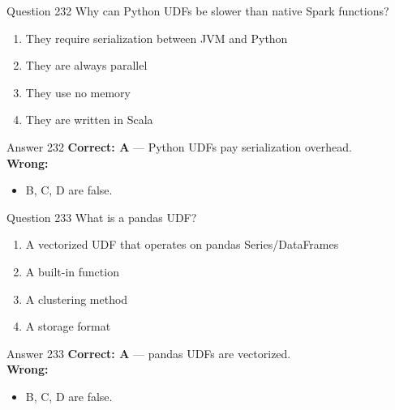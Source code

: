 \documentclass[aspectratio=169,11pt]{beamer}
\begin{document}
	\begin{frame}{Question 232}
		Why can Python UDFs be slower than native Spark functions?
		\begin{enumerate}[label=\Alph*.]
			\item They require serialization between JVM and Python
			\item They are always parallel
			\item They use no memory
			\item They are written in Scala
		\end{enumerate}
	\end{frame}
	\begin{frame}{Answer 232}
		\textbf{Correct: A} --- Python UDFs pay serialization overhead.\\
		\vspace{0.5em}
		\textbf{Wrong:}
		\begin{itemize}
			\item B, C, D are false.
		\end{itemize}
	\end{frame}
	
	\begin{frame}{Question 233}
		What is a pandas UDF?
		\begin{enumerate}[label=\Alph*.]
			\item A vectorized UDF that operates on pandas Series/DataFrames
			\item A built-in function
			\item A clustering method
			\item A storage format
		\end{enumerate}
	\end{frame}
	\begin{frame}{Answer 233}
		\textbf{Correct: A} --- pandas UDFs are vectorized.\\
		\vspace{0.5em}
		\textbf{Wrong:}
		\begin{itemize}
			\item B, C, D are false.
		\end{itemize}
	\end{frame}
	
\end{document}
